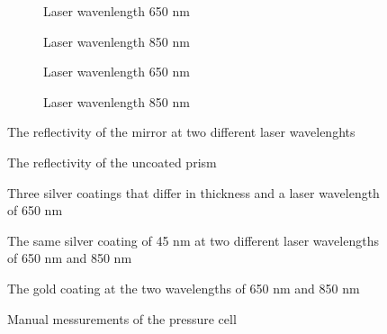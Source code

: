 \documentclass[twoside,english,headsepline=on,DIV=12]{scrartcl}
\numberwithin{equation}{section}
\begin{document}
\begin{figure}
	\begin{subfigure}{.48\textwidth}
		
		\caption{Laser wavenlength 650 nm}
	\end{subfigure}
	\begin{subfigure}{.48\textwidth}
		
		\caption{Laser wavenlength 850 nm}
	\end{subfigure}
	\begin{subfigure}{.48\textwidth}
		
		\caption{Laser wavenlength 650 nm}
	\end{subfigure}
	\begin{subfigure}{.48\textwidth}
		
		\caption{Laser wavenlength 850 nm}
	\end{subfigure}
	\caption{The reflectivity of the mirror at two different laser wavelenghts}
\end{figure}
\begin{figure}
	
	\caption{The reflectivity of the uncoated prism}
\end{figure}
\begin{figure}
	
	\caption{Three silver coatings that differ in thickness and a laser wavelength of 650 nm}
\end{figure}
\begin{figure}
	
	\caption{The same silver coating of 45 nm at two different laser wavelengths of 650 nm and 850 nm}
\end{figure}
\begin{figure}
	
	\caption{The gold coating at the two wavelengths of 650 nm and 850 nm}
\end{figure}
\begin{figure}
	
	\caption{Manual messurements of the pressure cell}
\end{figure}
\printbibliography
\end{document}
